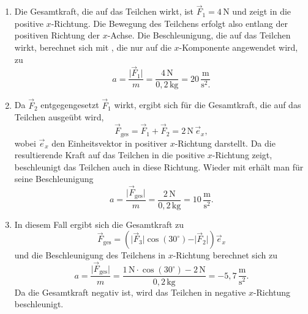 \begin{MExercises}
\begin{MExercise}
\begin{MSolution}
               \begin{enumerate}
               \item Die Gesamtkraft, die auf das Teilchen wirkt, ist  $\vec{F}_1= 4\,\text{N}$ und zeigt in die positive $x$-Richtung. Die Bewegung des Teilchens erfolgt also entlang der positiven Richtung der $x$-Achse. Die Beschleunigung, die auf das Teilchen wirkt, berechnet sich mit , die nur auf die $x$-Komponente angewendet wird, zu
               \begin{equation*}
               a=\frac{\vert\vec{F}_1\vert}{m}=\frac{4\,\text{N}}{{0,2}\,\text{kg}}=20\,\frac{\text{m}}{\text{s}^2.}
               \end{equation*}
               \item Da $\vec{F}_2$ entgegengesetzt $\vec{F}_1$ wirkt, ergibt sich f\"ur die Gesamtkraft, die auf das Teilchen ausge\"ubt wird,
               \begin{equation*}
               \vec{F}_{\text{ges}}=\vec{F}_1+\vec{F}_2=2\,\text{N}\,\vec{e}_x,
               \end{equation*}wobei $\vec{e}_x$ den Einheitsvektor in positiver $x$-Richtung darstellt. Da die resultierende Kraft auf das Teilchen in die positive $x$-Richtung zeigt, beschleunigt das Teilchen auch in diese Richtung. Wieder mit  erh\"alt man f\"ur seine Beschleunigung
               \begin{equation*}
               a=\frac{\vert\vec{F}_{\text{ges}}\vert}{m}=\frac{2\,\text{N}}{{0,2}\,\text{kg}}=10\,\frac{\text{m}}{\text{s}^2}.
               \end{equation*}
               \item In diesem Fall ergibt sich die Gesamtkraft zu 
               \begin{equation*}
               \vec{F}_{\text{ges}}=\left(\vert \vec{F}_3\vert\cos(30^{\circ})-\vert\vec{F}_2\vert\right)\vec{e}_x
               \end{equation*}und die Beschleunigung des Teilchens in $x$-Richtung berechnet sich zu
               \begin{equation*}
               a=\frac{\vert\vec{F}_{\text{ges}}\vert}{m}=\frac{1\,\text{N}\cdot\cos(30^{\circ})-2\,\text{N}}{{0,2}\,\text{kg}}=-{5,7}\,\frac{\text{m}}{\text{s}^2}.
               \end{equation*} Da die Gesamtkraft negativ ist, wird das Teilchen in negative $x$-Richtung beschleunigt.
               \end{enumerate}
               \end{MSolution}    
               

\end{MExercise}
\end{MExercises}
